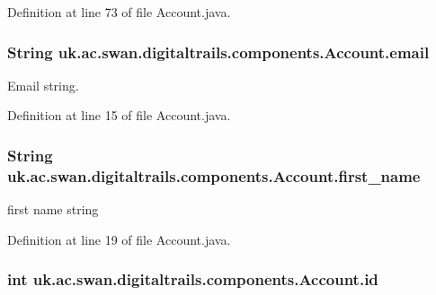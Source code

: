 Definition at line 73 of file Account.\+java.

\hypertarget{classuk_1_1ac_1_1swan_1_1digitaltrails_1_1components_1_1_account_abd57b618dc4da21e752c066057b4d58a}{
\subsubsection[{email}]{\setlength{\rightskip}{0pt plus 5cm}String uk.\+ac.\+swan.\+digitaltrails.\+components.\+Account.\+email}}\label{classuk_1_1ac_1_1swan_1_1digitaltrails_1_1components_1_1_account_abd57b618dc4da21e752c066057b4d58a}


Email string. 



Definition at line 15 of file Account.\+java.

\hypertarget{classuk_1_1ac_1_1swan_1_1digitaltrails_1_1components_1_1_account_a358d1327772c4154bac4cfaa1b3df8b4}{
\subsubsection[{first\+\_\+name}]{\setlength{\rightskip}{0pt plus 5cm}String uk.\+ac.\+swan.\+digitaltrails.\+components.\+Account.\+first\+\_\+name}}\label{classuk_1_1ac_1_1swan_1_1digitaltrails_1_1components_1_1_account_a358d1327772c4154bac4cfaa1b3df8b4}


first name string 



Definition at line 19 of file Account.\+java.

\hypertarget{classuk_1_1ac_1_1swan_1_1digitaltrails_1_1components_1_1_account_aebe5ad9be12a09ad6d182cabaf964862}{
\subsubsection[{id}]{\setlength{\rightskip}{0pt plus 5cm}int uk.\+ac.\+swan.\+digitaltrails.\+components.\+Account.\+id}}\label{classuk_1_1ac_1_1swan_1_1digitaltrails_1_1components_1_1_account_aebe5ad9be12a09ad6d182cabaf964862}


